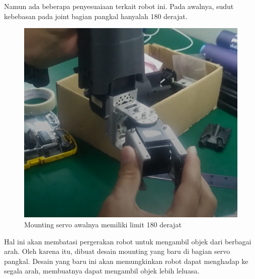 Namun ada beberapa penyesuaiaan terkait robot ini. Pada awalnya, sudut kebebasan pada joint bagian pangkal hanyalah 180 derajat.
\begin{figure} [H] \centering
    \includegraphics[scale=0.4]{gambar/base_sebelum.png}
    \caption{Mounting servo awalnya memiliki limit 180 derajat}
    \label{fig:base_sebelum}
\end{figure}
Hal ini akan membatasi pergerakan robot untuk mengambil objek dari berbagai arah. Oleh karena itu, dibuat desain mounting yang baru
di bagian servo pangkal. Desain yang baru ini akan memungkinkan robot dapat menghadap ke segala arah, membuatnya dapat mengambil 
objek lebih leluasa.

